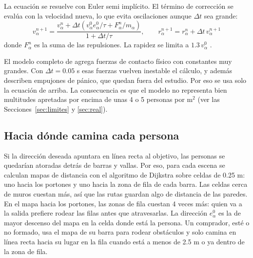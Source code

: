\documentclass[11pt,letterpaper]{article}
\begin{document}
La ecuación se resuelve con Euler semi implícito. El término de corrección se evalúa con la velocidad nueva, lo que evita oscilaciones aunque $\Delta t$ sea grande:
\begin{equation}
v^{n+1}_\alpha = \frac{v^n_\alpha + \Delta t \left(v^0_\alpha e^0_\alpha / \tau + F^n_\alpha / m_\alpha\right)}{1 + \Delta t/\tau}, \qquad r^{n+1}_\alpha = r^n_\alpha + \Delta t\, v^{n+1}_\alpha
\end{equation}
donde $F^n_\alpha$ es la suma de las repulsiones. La rapidez se limita a $1.3\, v^0_\alpha$ \citep{helbing1995}.

El modelo completo de \citet{helbing2000} agrega fuerzas de contacto físico con constantes muy grandes. Con $\Delta t = 0.05$ s esas fuerzas vuelven inestable el cálculo, y además describen empujones de pánico, que quedan fuera del estudio. Por eso se usa solo la ecuación de arriba. La consecuencia es que el modelo no representa bien multitudes apretadas por encima de unas 4 o 5 personas por m$^2$ (ver las Secciones~\ref{sec:limites} y \ref{sec:real}).

\subsection{Hacia dónde camina cada persona}
Si la dirección deseada apuntara en línea recta al objetivo, las personas se quedarían atoradas detrás de barras y vallas. Por eso, para cada escena se calculan mapas de distancia con el algoritmo de Dijkstra sobre celdas de 0.25 m: uno hacia los portones y uno hacia la zona de fila de cada barra. Las celdas cerca de muros cuestan más, así que las rutas guardan algo de distancia de las paredes. En el mapa hacia los portones, las zonas de fila cuestan 4 veces más: quien va a la salida prefiere rodear las filas antes que atravesarlas. La dirección $e^0_\alpha$ es la de mayor descenso del mapa en la celda donde está la persona. Un comprador, esté o no formado, usa el mapa de su barra para rodear obstáculos y solo camina en línea recta hacia su lugar en la fila cuando está a menos de 2.5 m o ya dentro de la zona de fila.
\end{document}
